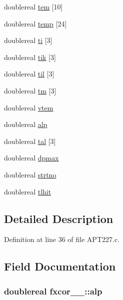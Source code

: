 \begin{DoxyCompactItemize}
\item 
doublereal \hyperlink{structfxcor__1___a31bd80b8cdb91061d6effcd14820d5df}{tem} \mbox{[}10\mbox{]}
\item 
doublereal \hyperlink{structfxcor__1___a0a7f67f7045034aaf5364362a3dbaa87}{temp} \mbox{[}24\mbox{]}
\item 
doublereal \hyperlink{structfxcor__1___a493e91923d4090e0c86da8ea1f099bf1}{ti} \mbox{[}3\mbox{]}
\item 
doublereal \hyperlink{structfxcor__1___a3991f01d65eb1787c59c4733c99e389f}{tik} \mbox{[}3\mbox{]}
\item 
doublereal \hyperlink{structfxcor__1___a060dd257a3c55b5a22f5cef7542d27bd}{til} \mbox{[}3\mbox{]}
\item 
doublereal \hyperlink{structfxcor__1___a2780d7f3d7830963f9f0d47b85d9a820}{tm} \mbox{[}3\mbox{]}
\item 
doublereal \hyperlink{structfxcor__1___a2f6face9ace9e80ff5f8cc99f2bf2343}{vtem}
\item 
doublereal \hyperlink{structfxcor__1___af32ebe8d9ef1d8e0f00c056de2d7bad5}{alp}
\item 
doublereal \hyperlink{structfxcor__1___a9a2ff421a88a47ce236439b3126361c4}{tal} \mbox{[}3\mbox{]}
\item 
doublereal \hyperlink{structfxcor__1___a30506e623dc25d4b11ebef787b8f349d}{dpmax}
\item 
doublereal \hyperlink{structfxcor__1___a022242eb0fff221e9dc2fe4d1dde1259}{strtno}
\item 
doublereal \hyperlink{structfxcor__1___a2333a0c5d894393900de07f5bf5cb3a3}{tlhit}
\end{DoxyCompactItemize}


\subsection{Detailed Description}


Definition at line 36 of file A\+P\+T227.\+c.



\subsection{Field Documentation}
\subsubsection[{\texorpdfstring{alp}{alp}}]{\setlength{\rightskip}{0pt plus 5cm}doublereal fxcor\+\_\+\_\+\+::alp}\hypertarget{structfxcor__1___af32ebe8d9ef1d8e0f00c056de2d7bad5}{}\label{structfxcor__1___af32ebe8d9ef1d8e0f00c056de2d7bad5}


